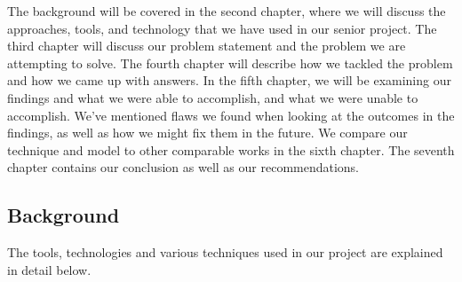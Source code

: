 \documentclass[]{article}
\begin{document}
The background will be covered in the second chapter, where we will discuss the approaches, tools, and technology that we have used in our senior project. The third chapter will discuss our problem statement and the problem we are attempting to solve. The fourth chapter will describe how we tackled the problem and how we came up with answers. In the fifth chapter, we will be examining our findings and what we were able to accomplish, and what we were unable to accomplish. We've mentioned flaws we found when looking at the outcomes in the findings, as well as how we might fix them in the future. We compare our technique and model to other comparable works in the sixth chapter. The seventh chapter contains our conclusion as well as our recommendations.

\begin{center}
    \item\section{Background}
\end{center}
The tools, technologies and various techniques used in our project are explained in detail below.\vspace{0.25cm}
\end{document}

